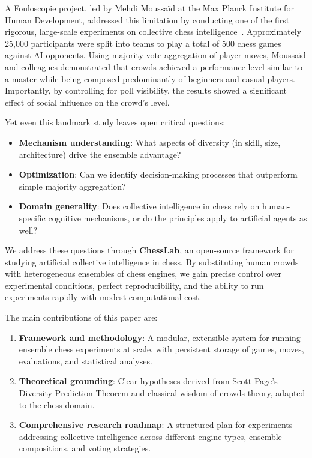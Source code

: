 \documentclass[format=acmsmall, review=false]{acmart}
\begin{document}
A Fouloscopie project, led by Mehdi Moussaïd at the Max Planck Institute for Human Development, addressed this limitation by conducting one of the first rigorous, large-scale experiments on collective chess intelligence~\cite{moussaid2025}.
Approximately 25,000 participants were split into teams to play a total of 500 chess games against AI opponents.
Using majority-vote aggregation of player moves, Moussaïd and colleagues demonstrated that crowds achieved a performance level similar to a master while being composed predominantly of beginners and casual players.
Importantly, by controlling for poll visibility, the results showed a significant effect of social influence on the crowd's level.

Yet even this landmark study leaves open critical questions:
\begin{itemize}
  \item \textbf{Mechanism understanding}: What aspects of diversity (in skill, size, architecture) drive the ensemble advantage?
  \item \textbf{Optimization}: Can we identify decision-making processes that outperform simple majority aggregation?
  \item \textbf{Domain generality}: Does collective intelligence in chess rely on human-specific cognitive mechanisms, or do the principles apply to artificial agents as well?
\end{itemize}

We address these questions through \textbf{ChessLab}, an open-source framework for studying artificial collective intelligence in chess.
By substituting human crowds with heterogeneous ensembles of chess engines, we gain precise control over experimental conditions, perfect reproducibility, and the ability to run experiments rapidly with modest computational cost.

The main contributions of this paper are:
\begin{enumerate}
  \item \textbf{Framework and methodology}: A modular, extensible system for running ensemble chess experiments at scale, with persistent storage of games, moves, evaluations, and statistical analyses.
  \item \textbf{Theoretical grounding}: Clear hypotheses derived from Scott Page's Diversity Prediction Theorem and classical wisdom-of-crowds theory, adapted to the chess domain.
  \item \textbf{Comprehensive research roadmap}: A structured plan for experiments addressing collective intelligence across different engine types, ensemble compositions, and voting strategies.
\end{enumerate}
\end{document}
